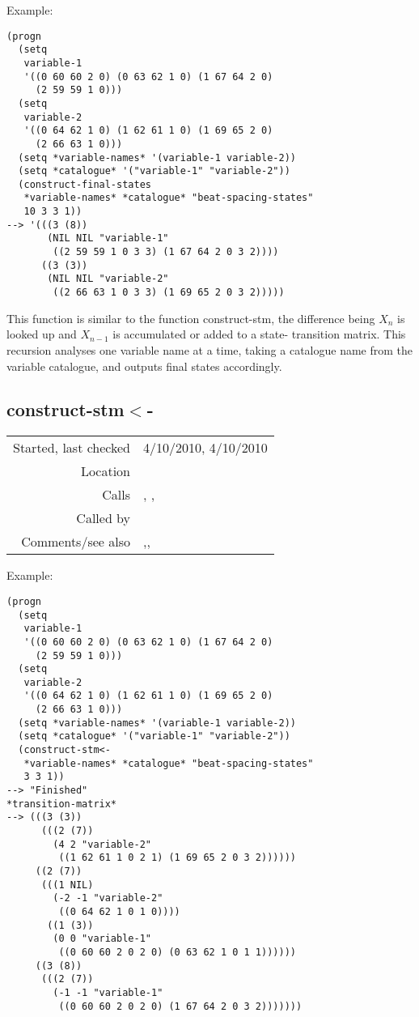 \vspace{0.5cm}
\noindent Example:
\begin{verbatim}
(progn
  (setq
   variable-1
   '((0 60 60 2 0) (0 63 62 1 0) (1 67 64 2 0)
     (2 59 59 1 0)))
  (setq
   variable-2
   '((0 64 62 1 0) (1 62 61 1 0) (1 69 65 2 0)
     (2 66 63 1 0)))
  (setq *variable-names* '(variable-1 variable-2))
  (setq *catalogue* '("variable-1" "variable-2"))
  (construct-final-states
   *variable-names* *catalogue* "beat-spacing-states"
   10 3 3 1))
--> '(((3 (8))
       (NIL NIL "variable-1"
        ((2 59 59 1 0 3 3) (1 67 64 2 0 3 2))))
      ((3 (3))
       (NIL NIL "variable-2"
        ((2 66 63 1 0 3 3) (1 69 65 2 0 3 2)))))
\end{verbatim}

\noindent This function is similar to the function
construct-stm, the difference being $X_n$ is looked
up and $X_{n-1}$ is accumulated or added to a state-
transition matrix. This recursion analyses one
variable name at a time, taking a catalogue name from
the variable catalogue, and outputs final
states accordingly.


\subsection*{construct-stm$<$-}\label{fun:construct-stm<-}

\vspace{0.3cm}
\begin{tabular}{r|p{8cm}}
Started, last checked & 4/10/2010, 4/10/2010 \\
Location & \nameref{sec:markov-analyse-backwards} \\
Calls & \nameref{fun:beat-spacing-states}, \nameref{fun:markov-analyse<-},\newline \nameref{fun:spacing-holding-states} \\
Called by & \\
Comments/see also & \nameref{fun:construct-final-states},\newline \nameref{fun:construct-initial-states}, \nameref{fun:construct-stm}
\end{tabular}

\vspace{0.5cm}
\noindent Example:
\begin{verbatim}
(progn
  (setq
   variable-1
   '((0 60 60 2 0) (0 63 62 1 0) (1 67 64 2 0)
     (2 59 59 1 0)))
  (setq
   variable-2
   '((0 64 62 1 0) (1 62 61 1 0) (1 69 65 2 0)
     (2 66 63 1 0)))
  (setq *variable-names* '(variable-1 variable-2))
  (setq *catalogue* '("variable-1" "variable-2"))
  (construct-stm<-
   *variable-names* *catalogue* "beat-spacing-states"
   3 3 1))
--> "Finished"
*transition-matrix*
--> (((3 (3))
      (((2 (7))
        (4 2 "variable-2"
         ((1 62 61 1 0 2 1) (1 69 65 2 0 3 2))))))
     ((2 (7))
      (((1 NIL)
        (-2 -1 "variable-2"
         ((0 64 62 1 0 1 0))))
       ((1 (3))
        (0 0 "variable-1"
         ((0 60 60 2 0 2 0) (0 63 62 1 0 1 1))))))
     ((3 (8))
      (((2 (7))
        (-1 -1 "variable-1"
         ((0 60 60 2 0 2 0) (1 67 64 2 0 3 2)))))))
\end{verbatim}

